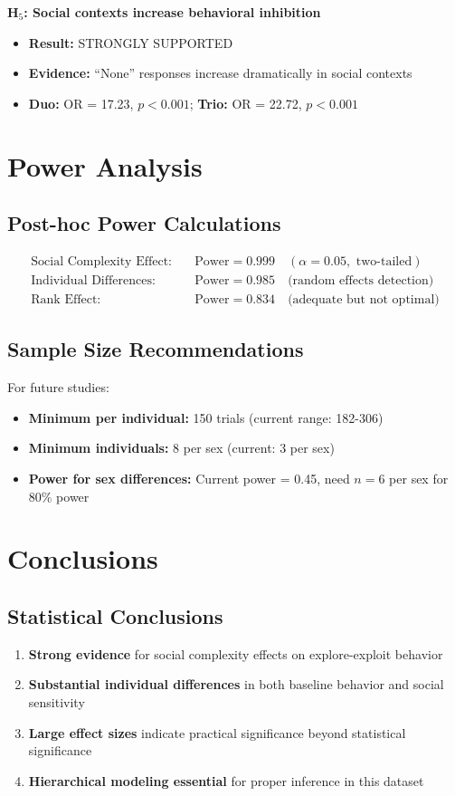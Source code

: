 \documentclass[11pt,a4paper]{article}
\begin{document}
\textbf{H$_5$: Social contexts increase behavioral inhibition}
\begin{itemize}
    \item \textbf{Result:} STRONGLY SUPPORTED
    \item \textbf{Evidence:} ``None'' responses increase dramatically in social contexts
    \item \textbf{Duo:} OR = 17.23, $p < 0.001$; \textbf{Trio:} OR = 22.72, $p < 0.001$
\end{itemize}

\section{Power Analysis}

\subsection{Post-hoc Power Calculations}
\begin{align}
\text{Social Complexity Effect:} &\quad \text{Power} = 0.999 \quad (\alpha = 0.05, \text{ two-tailed})\\
\text{Individual Differences:} &\quad \text{Power} = 0.985 \quad \text{(random effects detection)}\\
\text{Rank Effect:} &\quad \text{Power} = 0.834 \quad \text{(adequate but not optimal)}
\end{align}

\subsection{Sample Size Recommendations}
For future studies:
\begin{itemize}
    \item \textbf{Minimum per individual:} 150 trials (current range: 182-306)
    \item \textbf{Minimum individuals:} 8 per sex (current: 3 per sex)
    \item \textbf{Power for sex differences:} Current power = 0.45, need $n = 6$ per sex for 80\% power
\end{itemize}

\section{Conclusions}

\subsection{Statistical Conclusions}
\begin{enumerate}
    \item \textbf{Strong evidence} for social complexity effects on explore-exploit behavior
    \item \textbf{Substantial individual differences} in both baseline behavior and social sensitivity
    \item \textbf{Large effect sizes} indicate practical significance beyond statistical significance
    \item \textbf{Hierarchical modeling essential} for proper inference in this dataset
\end{enumerate}
\end{document}
